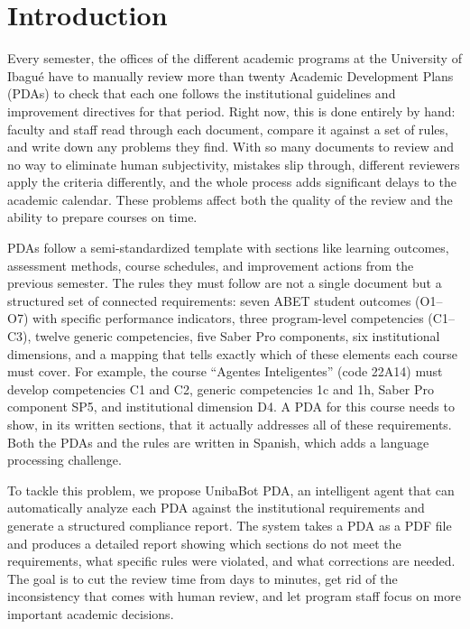\documentclass[conference]{IEEEtran}
\begin{document}
\section{Introduction}

Every semester, the offices of the different academic programs at the University of Ibagu\'{e} have to manually review more than twenty Academic Development Plans (PDAs) to check that each one follows the institutional guidelines and improvement directives for that period. Right now, this is done entirely by hand: faculty and staff read through each document, compare it against a set of rules, and write down any problems they find. With so many documents to review and no way to eliminate human subjectivity, mistakes slip through, different reviewers apply the criteria differently, and the whole process adds significant delays to the academic calendar. These problems affect both the quality of the review and the ability to prepare courses on time.

PDAs follow a semi-standardized template with sections like learning outcomes, assessment methods, course schedules, and improvement actions from the previous semester. The rules they must follow are not a single document but a structured set of connected requirements: seven ABET student outcomes (O1--O7) with specific performance indicators, three program-level competencies (C1--C3), twelve generic competencies, five Saber Pro components, six institutional dimensions, and a mapping that tells exactly which of these elements each course must cover. For example, the course ``Agentes Inteligentes'' (code 22A14) must develop competencies C1 and C2, generic competencies 1c and 1h, Saber Pro component SP5, and institutional dimension D4. A PDA for this course needs to show, in its written sections, that it actually addresses all of these requirements. Both the PDAs and the rules are written in Spanish, which adds a language processing challenge.

To tackle this problem, we propose UnibaBot PDA, an intelligent agent that can automatically analyze each PDA against the institutional requirements and generate a structured compliance report. The system takes a PDA as a PDF file and produces a detailed report showing which sections do not meet the requirements, what specific rules were violated, and what corrections are needed. The goal is to cut the review time from days to minutes, get rid of the inconsistency that comes with human review, and let program staff focus on more important academic decisions.
\end{document}
